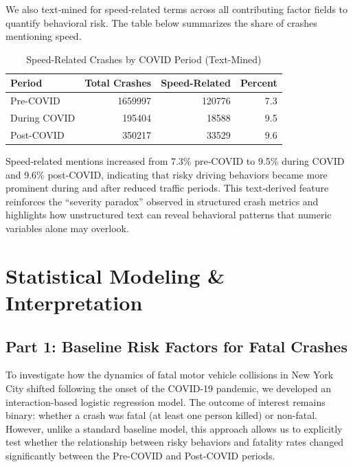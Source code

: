 \documentclass[10pt]{article}\usepackage[]{graphicx}\usepackage[]{xcolor}
\newenvironment{knitrout}{}{} %
\begin{document}
We also text‑mined for speed‑related terms across all contributing factor fields to quantify behavioral risk. The table below summarizes the share of crashes mentioning speed.

\begin{knitrout}
\color{fgcolor}\begin{table}

\caption{\label{tab:unnamed-chunk-15}Speed-Related Crashes by COVID Period (Text-Mined)}
\centering
\begin{tabular}[t]{l|r|r|r}
\hline
Period & Total Crashes & Speed-Related & Percent\\
\hline
Pre-COVID & 1659997 & 120776 & 7.3\\
\hline
During COVID & 195404 & 18588 & 9.5\\
\hline
Post-COVID & 350217 & 33529 & 9.6\\
\hline
\end{tabular}
\end{table}

\end{knitrout}

Speed‑related mentions increased from 7.3\% pre‑COVID to 9.5\% during COVID and 9.6\% post‑COVID, indicating that risky driving behaviors became more prominent during and after reduced traffic periods. This text‑derived feature reinforces the “severity paradox” observed in structured crash metrics and highlights how unstructured text can reveal behavioral patterns that numeric variables alone may overlook.

\newpage

\section{Statistical Modeling \& Interpretation}

\subsection{Part 1: Baseline Risk Factors for Fatal Crashes}

To investigate how the dynamics of fatal motor vehicle collisions in New York City shifted following the onset of the COVID-19 pandemic, we developed an interaction-based logistic regression model. The outcome of interest remains binary: whether a crash was fatal (at least one person killed) or non-fatal. However, unlike a standard baseline model, this approach allows us to explicitly test whether the relationship between risky behaviors and fatality rates changed significantly between the Pre-COVID and Post-COVID periods.
\end{document}

